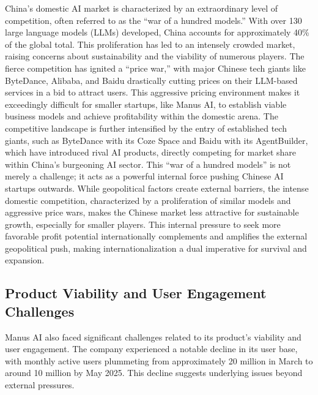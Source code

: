 China's domestic AI market is characterized by an extraordinary level of competition, often referred to as the ``war of a hundred models.'' With over 130 large language models (LLMs) developed, China accounts for approximately 40\% of the global total.
This proliferation has led to an intensely crowded market, raising concerns about sustainability and the viability of numerous players.
The fierce competition has ignited a ``price war,'' with major Chinese tech giants like ByteDance, Alibaba, and Baidu drastically cutting prices on their LLM-based services in a bid to attract users.
This aggressive pricing environment makes it exceedingly difficult for smaller startups, like Manus AI, to establish viable business models and achieve profitability within the domestic arena.
The competitive landscape is further intensified by the entry of established tech giants, such as ByteDance with its Coze Space and Baidu with its AgentBuilder, which have introduced rival AI products, directly competing for market share within China's burgeoning AI sector.
This ``war of a hundred models'' is not merely a challenge; it acts as a powerful internal force pushing Chinese AI startups outwards.
While geopolitical factors create external barriers, the intense domestic competition, characterized by a proliferation of similar models and aggressive price wars, makes the Chinese market less attractive for sustainable growth, especially for smaller players.
This internal pressure to seek more favorable profit potential internationally complements and amplifies the external geopolitical push, making internationalization a dual imperative for survival and expansion.

\subsection{Product Viability and User Engagement Challenges}

Manus AI also faced significant challenges related to its product's viability and user engagement.
The company experienced a notable decline in its user base, with monthly active users plummeting from approximately 20 million in March to around 10 million by May 2025.
This decline suggests underlying issues beyond external pressures.

